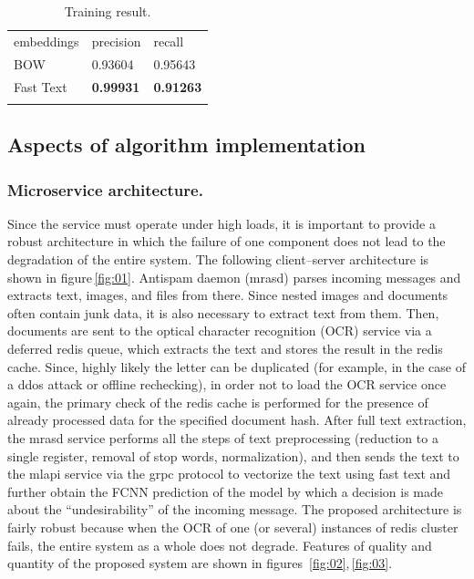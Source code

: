 \documentclass[12pt]{jpconf}
\begin{document}
\begin{table}[h!]
	\centering
	\caption{\label{tbl:02}Training result.}
	\begin{center}
		\begin{tabular}{lll}
			\br
			embeddings & precision & recall \\
			\mr
			BOW & 0.93604 & 0.95643 \\ \hline
			Fast Text & \bf 0.99931 & \bf 0.91263 \\ 
			\br
		\end{tabular}
	\end{center}
\end{table}


\subsection{Aspects of algorithm implementation}

\subsubsection*{Microservice architecture.}

Since the service must operate under high loads, it is important to provide a robust architecture in which the failure of one component does not lead to the degradation of the entire system. The following client--server architecture is shown in figure\,\ref{fig:01}. Antispam daemon (mrasd) parses incoming messages and extracts text, images, and files from there. Since nested images and documents often contain junk data, it is also necessary to extract text from them. Then, documents are sent to the optical character recognition (OCR) service via a deferred redis queue, which extracts the text and stores the result in the redis cache.
Since, highly likely the letter can be duplicated (for example, in the case of a ddos attack or offline rechecking), in order not to load the OCR service once again, the primary check of the redis cache is performed for the presence of already processed data for the specified document hash.
After full text extraction, the mrasd service performs all the steps of text preprocessing (reduction to a single register, removal of stop words, normalization), and then sends the text to the mlapi service via the grpc protocol to vectorize the text using fast text and further obtain the FCNN prediction of the model by which a decision is made about the ``undesirability'' of the incoming message.
The proposed architecture is fairly robust because when the OCR of one (or several) instances of redis cluster fails, the entire system as a whole does not degrade. Features of quality and quantity of the proposed system are shown in figures~\ref{fig:02},\,\ref{fig:03}.
\end{document}
